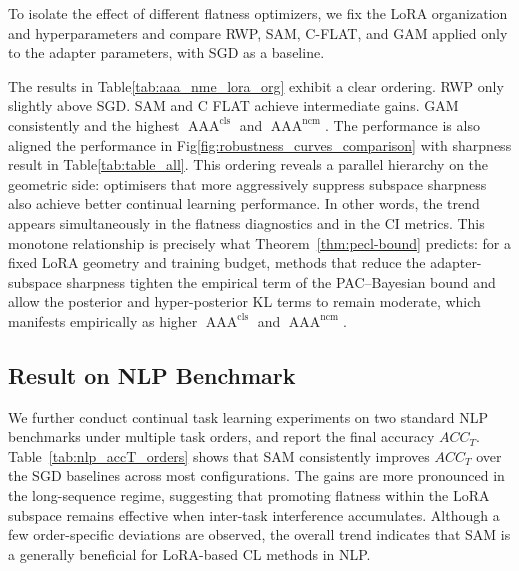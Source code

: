 \documentclass{article}
\theoremstyle{plain}
\theoremstyle{definition}
\theoremstyle{remark}
\begin{document}
To isolate the effect of different flatness optimizers, we fix the LoRA organization and hyperparameters and compare RWP, SAM, C-FLAT, and GAM applied only to the adapter parameters, with SGD as a baseline. 



The results in Table\ref{tab:aaa_nme_lora_org} exhibit a clear ordering. 
RWP only slightly above  SGD. 
SAM and C FLAT achieve intermediate gains. 
GAM consistently  and the highest $\operatorname{AAA}^{\mathrm{cls}}$ and $\operatorname{AAA}^{\mathrm{ncm}}$. 
The performance is also aligned the performance in Fig\ref{fig:robustness_curves_comparison} with sharpness result in Table\ref{tab:table_all}.
This ordering reveals a parallel hierarchy on the geometric side: optimisers that more aggressively suppress subspace sharpness also achieve better continual learning performance. In other words, the trend appears simultaneously in the flatness diagnostics and in the CI metrics. This monotone relationship is precisely what Theorem~\ref{thm:pecl-bound} predicts: for a fixed LoRA geometry and training budget, methods that reduce the adapter-subspace sharpness tighten the empirical term of the PAC–Bayesian bound and allow the posterior and hyper-posterior KL terms to remain moderate, which manifests empirically as higher $\operatorname{AAA}^{\mathrm{cls}}$ and $\operatorname{AAA}^{\mathrm{ncm}}$.

\subsection{Result on NLP Benchmark}


We further conduct continual task learning experiments on two standard NLP benchmarks under multiple task orders, and report the final accuracy $ACC_T$. Table~\ref{tab:nlp_accT_orders} shows that SAM consistently improves $ACC_T$ over the SGD baselines across most configurations. The gains are more pronounced in the long-sequence regime, suggesting that promoting flatness within the LoRA subspace remains effective when inter-task interference accumulates. Although a few order-specific deviations are observed, the overall trend indicates that SAM is a generally beneficial for LoRA-based CL methods in NLP.
\end{document}
